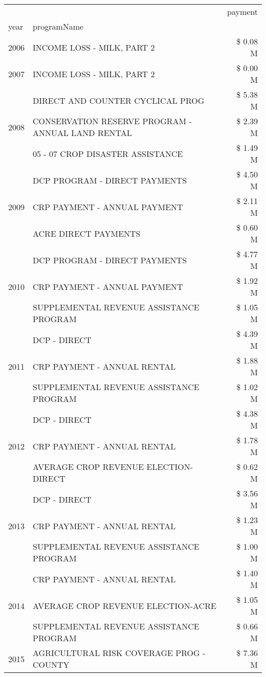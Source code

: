 \begin{tabular}{llr}
\toprule
 &  & payment \\
year & programName &  \\
\midrule
2006 & INCOME LOSS - MILK, PART 2 & \$ 0.08 M \\
\cline{1-3}
2007 & INCOME LOSS - MILK, PART 2 & \$ 0.00 M \\
\cline{1-3}
\multirow[t]{3}{*}{2008} & DIRECT AND COUNTER CYCLICAL PROG & \$ 5.38 M \\
 & CONSERVATION RESERVE PROGRAM - ANNUAL LAND RENTAL & \$ 2.39 M \\
 & 05 - 07 CROP DISASTER ASSISTANCE & \$ 1.49 M \\
\cline{1-3}
\multirow[t]{3}{*}{2009} & DCP PROGRAM - DIRECT PAYMENTS & \$ 4.50 M \\
 & CRP PAYMENT - ANNUAL PAYMENT & \$ 2.11 M \\
 & ACRE DIRECT PAYMENTS & \$ 0.60 M \\
\cline{1-3}
\multirow[t]{3}{*}{2010} & DCP PROGRAM - DIRECT PAYMENTS & \$ 4.77 M \\
 & CRP PAYMENT - ANNUAL PAYMENT & \$ 1.92 M \\
 & SUPPLEMENTAL REVENUE ASSISTANCE PROGRAM & \$ 1.05 M \\
\cline{1-3}
\multirow[t]{3}{*}{2011} & DCP - DIRECT & \$ 4.39 M \\
 & CRP PAYMENT - ANNUAL RENTAL & \$ 1.88 M \\
 & SUPPLEMENTAL REVENUE ASSISTANCE PROGRAM & \$ 1.02 M \\
\cline{1-3}
\multirow[t]{3}{*}{2012} & DCP - DIRECT & \$ 4.38 M \\
 & CRP PAYMENT - ANNUAL RENTAL & \$ 1.78 M \\
 & AVERAGE CROP REVENUE ELECTION-DIRECT & \$ 0.62 M \\
\cline{1-3}
\multirow[t]{3}{*}{2013} & DCP - DIRECT & \$ 3.56 M \\
 & CRP PAYMENT - ANNUAL RENTAL & \$ 1.23 M \\
 & SUPPLEMENTAL REVENUE ASSISTANCE PROGRAM & \$ 1.00 M \\
\cline{1-3}
\multirow[t]{3}{*}{2014} & CRP PAYMENT - ANNUAL RENTAL & \$ 1.40 M \\
 & AVERAGE CROP REVENUE ELECTION-ACRE & \$ 1.05 M \\
 & SUPPLEMENTAL REVENUE ASSISTANCE PROGRAM & \$ 0.66 M \\
\cline{1-3}
\multirow[t]{3}{*}{2015} & AGRICULTURAL RISK COVERAGE PROG - COUNTY & \$ 7.36 M \\

\end{tabular}
